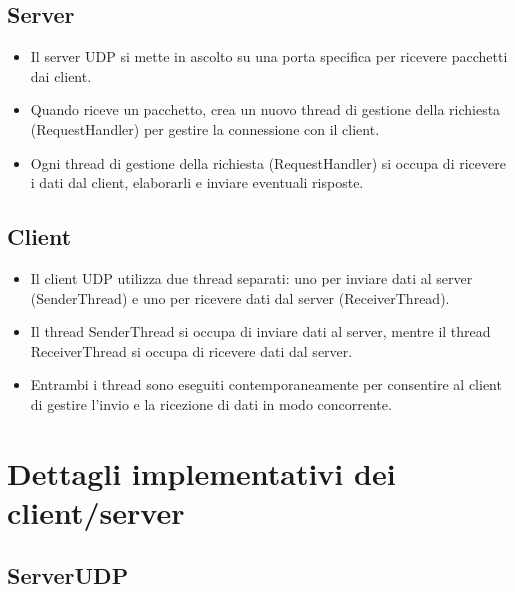 \documentclass{article}
\begin{document}
\subsection{Server}
\begin{itemize}
    \item Il server UDP si mette in ascolto su una porta specifica per ricevere pacchetti dai client.
    \item Quando riceve un pacchetto, crea un nuovo thread di gestione della richiesta (RequestHandler) per gestire la connessione con il client.
    \item Ogni thread di gestione della richiesta (RequestHandler) si occupa di ricevere i dati dal client, elaborarli e inviare eventuali risposte.
\end{itemize}

\subsection{Client}
\begin{itemize}
    \item Il client UDP utilizza due thread separati: uno per inviare dati al server (SenderThread) e uno per ricevere dati dal server (ReceiverThread).
    \item Il thread SenderThread si occupa di inviare dati al server, mentre il thread ReceiverThread si occupa di ricevere dati dal server.
    \item Entrambi i thread sono eseguiti contemporaneamente per consentire al client di gestire l'invio e la ricezione di dati in modo concorrente.
\end{itemize}
\pagebreak

\section{Dettagli implementativi dei client/server}
\label{sec:Dettagli implementativi dei client/server}
\subsection{ServerUDP}
\end{document}

